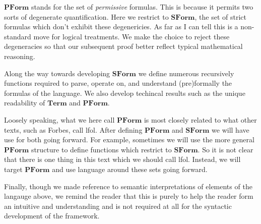 \documentclass[oneside, 12pt]{book}
\theoremstyle{break}
\newtheorem{preformal definition}[definition]{Preformal Definition}
\newtheorem{preformal theorem}[theorem]{Preformal Theorem}
\begin{document}
		$\textbf{PForm}$ stands for the set of \textit{permissive} formulas.
		This is because it permits two sorts of degenerate quantification.
		Here we restrict to $\textbf{SForm}$, the set of strict formulas which don't exhibit these degenericies.
		As far as I can tell this is a non-standard move for logical treatments. 
		We make the choice to reject these degeneracies so that our subsequent proof better reflect typical mathematical reasoning.
		
		Along the way towards developing $\textbf{SForm}$ we define numerous recursively functions required to parse, operate on, and understand (pre)formally the formulas of the language.
		We also develop techincal results such as the unique readability of $\textbf{Term}$ and $\textbf{PForm}$.
		
		Loosely speaking, what we here call $\textbf{PForm}$ is most closely related to what other texts, such as Forbes, call \gls{lfol}.
		After defining $\textbf{PForm}$ and $\textbf{SForm}$ we will have use for both going forward. 
		For example, sometimes we will use the more general $\textbf{PForm}$ structure to define functions which restrict to $\textbf{SForm}$. 
		So it is not clear that there is one thing in this text which we should call \gls{lfol}.
		Instead, we will target $\textbf{PForm}$ and use language around these sets going forward.
		
		Finally, though we made reference to semantic interpretations of elements of the langauge above, we remind the reader that this is purely to help the reader form an intuitive and understanding and is not required at all for the syntactic development of the framework.
		
\end{document}
